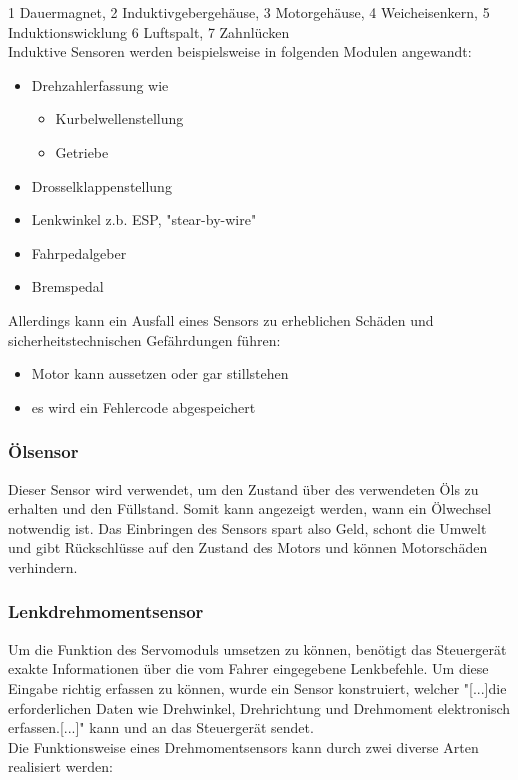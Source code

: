 				\begin{flushleft}
					1 Dauermagnet, 2 Induktivgebergehäuse, 3 Motorgehäuse, 4 Weicheisenkern, 5 Induktionswicklung 6 Luftspalt, 7 Zahnlücken\\
					Induktive Sensoren werden beispielsweise in folgenden Modulen angewandt:
					
					\begin{itemize}
						\item Drehzahlerfassung wie
							\begin{itemize}
								\item Kurbelwellenstellung
								\item Getriebe
							\end{itemize}	
						\item Drosselklappenstellung
						\item Lenkwinkel z.b. ESP, "stear-by-wire"
						\item Fahrpedalgeber
						\item Bremspedal
					\end{itemize}
				
					Allerdings kann ein Ausfall eines Sensors zu erheblichen Schäden und sicherheitstechnischen Gefährdungen führen:
					\begin{itemize}
						\item Motor kann aussetzen oder gar stillstehen
						\item es wird ein Fehlercode abgespeichert
					\end{itemize}	
				\end{flushleft}				
		
			\subsubsection{Ölsensor}
				\begin{flushleft}
					
					Dieser Sensor wird verwendet, um den Zustand über des verwendeten Öls zu erhalten und den Füllstand. Somit kann angezeigt werden, wann ein Ölwechsel notwendig ist. Das Einbringen des Sensors spart also Geld, schont die Umwelt und gibt Rückschlüsse auf den Zustand des Motors und können Motorschäden verhindern.\cite{TS10}

				\end{flushleft}		
		
			\subsubsection{Lenkdrehmomentsensor}
				Um die Funktion des Servomoduls umsetzen zu können, benötigt das Steuergerät exakte Informationen über die vom Fahrer eingegebene Lenkbefehle. Um diese Eingabe richtig erfassen zu können, wurde ein Sensor konstruiert, welcher "[...]die erforderlichen Daten wie Drehwinkel, Drehrichtung und Drehmoment elektronisch erfassen.[...]"\cite{TS11} kann und an das Steuergerät sendet.\\
				Die Funktionsweise eines Drehmomentsensors kann durch zwei diverse Arten realisiert werden:\\
				
